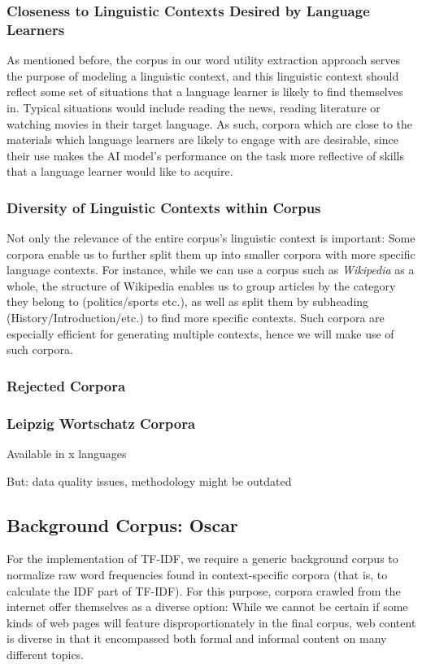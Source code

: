 \subsubsection{Closeness to Linguistic Contexts Desired by Language Learners}
As mentioned before, the corpus in our word utility extraction approach serves the purpose of modeling a linguistic context, and this linguistic context should reflect some set of situations that a language learner is likely to find themselves in.
Typical situations would include reading the news, reading literature or watching movies in their target language.
As such, corpora which are close to the materials which language learners are likely to engage with are desirable, since their use makes the AI model's performance on the task more reflective of skills that a language learner would like to acquire.

\subsubsection{Diversity of Linguistic Contexts within Corpus}
Not only the relevance of the entire corpus's linguistic context is important:
Some corpora enable us to further split them up into smaller corpora with more specific language contexts.
For instance, while we can use a corpus such as \textit{Wikipedia} as a whole, the structure of Wikipedia enables us to group articles by the category they belong to (politics/sports etc.), as well as split them by subheading (History/Introduction/etc.) to find more specific contexts.
Such corpora are especially efficient for generating multiple contexts, hence we will make use of such corpora.


\subsubsection{Rejected Corpora}
\subsubsection{Leipzig Wortschatz Corpora}
Available in x languages

But: data quality issues, methodology might be outdated

\cite{goldhahnBuildingLargeMonolingual2012}

\subsection{Background Corpus: Oscar}
For the implementation of TF-IDF, we require a generic background corpus to normalize raw word frequencies found in context-specific corpora (that is, to calculate the IDF part of TF-IDF).
For this purpose, corpora crawled from the internet offer themselves as a diverse option:
While we cannot be certain if some kinds of web pages will feature disproportionately in the final corpus, web content is diverse in that it encompassed both formal and informal content on many different topics.

